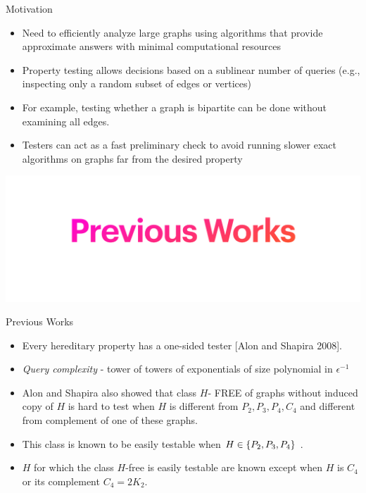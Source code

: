 \documentclass{beamer}
\begin{document}
\begin{frame}{Motivation}
	\begin{itemize}
		
	\item Need to efficiently analyze large graphs using algorithms that provide approximate answers with minimal computational resources 
	 \pause
	\item Property testing allows decisions based on a sublinear number of queries (e.g., inspecting only a random subset of edges or vertices)
	\pause
	\item  For example, testing whether a graph is bipartite can be done without examining all edges.
	\pause
	\item Testers can act as a fast preliminary check to avoid running slower exact algorithms on graphs far from the desired property 
\end{itemize}
\end{frame}


\begin{frame}
	\begin{center}
		\includegraphics[scale=0.5]{previous-works}
	\end{center}
	
\end{frame}

\begin{frame}{Previous Works}
	\begin{itemize}
		\item Every hereditary property has a one-sided tester [Alon and Shapira 2008]. \pause
		\item {\em Query complexity} - tower of towers of exponentials of size polynomial in $\epsilon ^{-1}$ \pause
		\item Alon and Shapira also showed that class $H$-{ FREE} of graphs without induced copy of $H$ is hard to test when $H$ is different from $P_2, P_3, P_4, C_4$ and different from complement of one of these graphs.
		\pause
		\item This class is known to be easily testable when  $H \in \left\{ P_2, P_3, P_4 \right\}$ . \pause
		\item $H$ for which the class $H$-free is easily testable are known except when $H$ is $C_4$ or its complement $C_4= 2K_2$.
	\end{itemize}
\end{frame}
\end{document}

